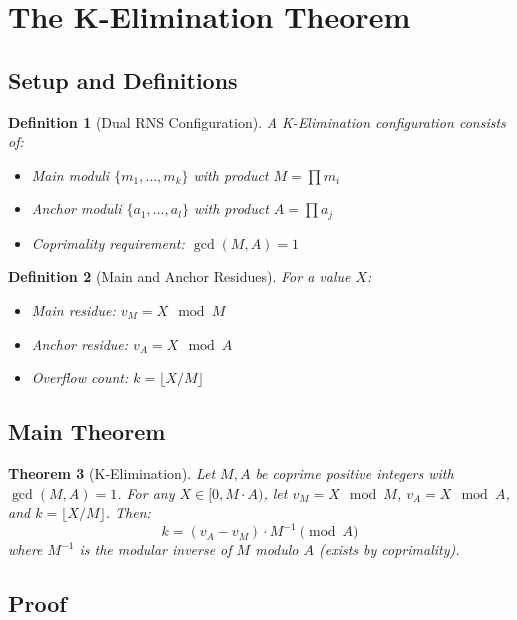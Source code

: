 \documentclass[11pt,a4paper]{article}
\newtheorem{theorem}{Theorem}[section]
\newtheorem{definition}[theorem]{Definition}
\begin{document}
\section{The K-Elimination Theorem}

\subsection{Setup and Definitions}

\begin{definition}[Dual RNS Configuration]
A K-Elimination configuration consists of:
\begin{itemize}[noitemsep]
    \item Main moduli $\{m_1, \ldots, m_k\}$ with product $M = \prod m_i$
    \item Anchor moduli $\{a_1, \ldots, a_l\}$ with product $A = \prod a_j$
    \item Coprimality requirement: $\gcd(M, A) = 1$
\end{itemize}
\end{definition}

\begin{definition}[Main and Anchor Residues]
For a value $X$:
\begin{itemize}[noitemsep]
    \item Main residue: $v_M = X \mod M$
    \item Anchor residue: $v_A = X \mod A$
    \item Overflow count: $k = \lfloor X/M \rfloor$
\end{itemize}
\end{definition}

\subsection{Main Theorem}

\begin{theorem}[K-Elimination]
\label{thm:kelim}
Let $M, A$ be coprime positive integers with $\gcd(M, A) = 1$. For any $X \in [0, M \cdot A)$, let $v_M = X \mod M$, $v_A = X \mod A$, and $k = \lfloor X/M \rfloor$. Then:
\[
\boxed{k = (v_A - v_M) \cdot M^{-1} \pmod{A}}
\]
where $M^{-1}$ is the modular inverse of $M$ modulo $A$ (exists by coprimality).
\end{theorem}

\subsection{Proof}
\end{document}
